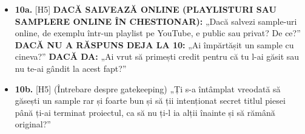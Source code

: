 \documentclass[12pt,a4paper]{report}
\newcommand{\cond}[1]{\textcolor{condition}{\textbf{#1}}}
\begin{document}
\begin{otherlanguage}{romanian}
\begin{itemize}
  \item \textbf{10a.} [H5] \cond{DACĂ SALVEAZĂ ONLINE (PLAYLISTURI SAU SAMPLERE ONLINE ÎN CHESTIONAR):} „Dacă salvezi sample-uri online, de exemplu într-un playlist pe YouTube, e public sau privat? De ce?” \cond{DACĂ NU A RĂSPUNS DEJA LA 10:} „Ai împărtășit un sample cu cineva?” \cond{DACĂ DA:} „Ai vrut să primești credit pentru că tu l-ai găsit sau nu te-ai gândit la acest fapt?”
  \item \textbf{10b.} [H5] (Întrebare despre gatekeeping) „Ți s-a întâmplat vreodată să găsești un sample rar și foarte bun și să ții intenționat secret titlul piesei până ți-ai terminat proiectul, ca să nu ți-l ia alții înainte și să rămână original?”
\end{itemize}

\end{otherlanguage}
\end{document}
